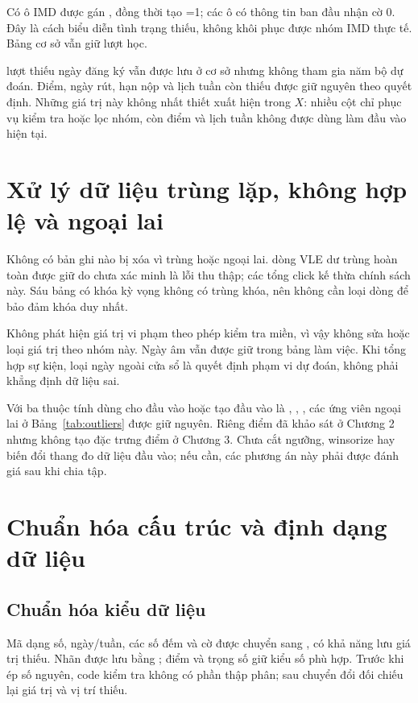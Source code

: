 Có \NImdUnknown{} ô IMD được gán , đồng thời tạo =1; các ô có thông tin ban đầu nhận cờ 0. Đây là cách biểu diễn tình trạng thiếu, không khôi phục được nhóm IMD thực tế. Bảng cơ sở vẫn giữ \NEnrollments{} lượt học.

\NUnknownRegistration{} lượt thiếu ngày đăng ký vẫn được lưu ở cơ sở nhưng không tham gia năm bộ dự đoán. Điểm, ngày rút, hạn nộp và lịch tuần còn thiếu được giữ nguyên theo quyết định. Những giá trị này không nhất thiết xuất hiện trong \(X\): nhiều cột chỉ phục vụ kiểm tra hoặc lọc nhóm, còn điểm và lịch tuần không được dùng làm đầu vào hiện tại.

\section{Xử lý dữ liệu trùng lặp, không hợp lệ và ngoại lai}
Không có bản ghi nào bị xóa vì trùng hoặc ngoại lai. \NExactDuplicates{} dòng VLE dư trùng hoàn toàn được giữ do chưa xác minh là lỗi thu thập; các tổng click kế thừa chính sách này. Sáu bảng có khóa kỳ vọng không có trùng khóa, nên không cần loại dòng để bảo đảm khóa duy nhất.

Không phát hiện giá trị vi phạm theo \NDomainRules{} phép kiểm tra miền, vì vậy không sửa hoặc loại giá trị theo nhóm này. Ngày âm vẫn được giữ trong bảng làm việc. Khi tổng hợp sự kiện, loại ngày ngoài cửa sổ là quyết định phạm vi dự đoán, không phải khẳng định dữ liệu sai.

Với ba thuộc tính dùng cho đầu vào hoặc tạo đầu vào là , , , các ứng viên ngoại lai ở Bảng~\ref{tab:outliers} được giữ nguyên. Riêng điểm đã khảo sát ở Chương 2 nhưng không tạo đặc trưng điểm ở Chương 3. Chưa cắt ngưỡng, winsorize hay biến đổi thang đo dữ liệu đầu vào; nếu cần, các phương án này phải được đánh giá sau khi chia tập.

\section{Chuẩn hóa cấu trúc và định dạng dữ liệu}
\subsection{Chuẩn hóa kiểu dữ liệu}
Mã dạng số, ngày/tuần, các số đếm và cờ được chuyển sang , có khả năng lưu giá trị thiếu. Nhãn được lưu bằng ; điểm và trọng số giữ kiểu số phù hợp. Trước khi ép số nguyên, code kiểm tra không có phần thập phân; sau chuyển đổi đối chiếu lại giá trị và vị trí thiếu.

